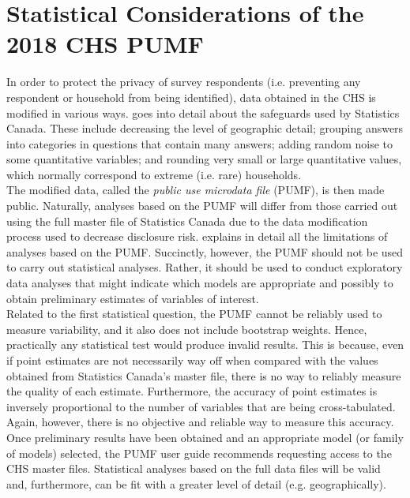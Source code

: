 \documentclass[11pt]{article}
\begin{document}
\section{Statistical Considerations of the 2018 CHS PUMF} \label{sec:stats}


In order to protect the privacy of survey respondents (i.e.
preventing any respondent or household from being identified), data obtained
in the CHS is modified in various ways. \cite[Section~6]{chsguide} goes
into detail about the safeguards used by Statistics Canada. These include
decreasing the level of geographic detail; grouping answers into
categories in questions that contain many answers; adding random noise to
some quantitative variables; and rounding very small or large quantitative
values, which normally correspond to extreme (i.e. rare) households.
\\


The modified data, called the \textit{public use microdata file} (PUMF),
is then made public. Naturally, analyses based on the PUMF will differ from
those carried out using the full master file of Statistics Canada due
to the data modification process used to decrease disclosure risk.
\cite[Section~7]{chsguide} explains in detail all the limitations of analyses
based on the PUMF. Succinctly, however, the PUMF should not be used to carry out
statistical analyses. Rather, it should be used to conduct exploratory data
analyses that might indicate which models are appropriate and possibly
to obtain preliminary estimates of variables of interest.
\\

Related to the first statistical question, the PUMF cannot be reliably used
to measure variability, and it also does not include bootstrap weights.
Hence, practically any statistical test would produce invalid results.
This is because, even if point estimates are not necessarily way off
when compared with the values obtained from Statistics Canada's master file,
there is no way to reliably measure the quality of each estimate.
Furthermore, the accuracy of point estimates is inversely proportional to
the number of variables that are being cross-tabulated.
Again, however, there is no objective and reliable way to measure this accuracy.
\\

Once preliminary results have been obtained and an appropriate model
(or family of models) selected, the PUMF user guide \cite{chsguide} recommends
requesting access to the CHS master files. Statistical analyses based on
the full data files will be valid and, furthermore, can be fit
with a greater level of detail (e.g. geographically).
\\
\end{document}
